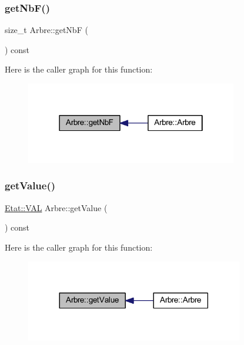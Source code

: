 \mbox{\label{class_arbre_a0aef1f091d76bca13229a21fcd45a076}} 
\subsubsection{\texorpdfstring{get\+Nb\+F()}{getNbF()}}
{\footnotesize\ttfamily size\+\_\+t Arbre\+::get\+NbF (\begin{DoxyParamCaption}{ }\end{DoxyParamCaption}) const}

Here is the caller graph for this function\+:\nopagebreak
\begin{figure}[H]
\begin{center}
\leavevmode
\includegraphics[width=262pt]{class_arbre_a0aef1f091d76bca13229a21fcd45a076_icgraph}
\end{center}
\end{figure}
\mbox{\label{class_arbre_aeaa93d0b192e3cce04adb509b6b29c40}} 
\subsubsection{\texorpdfstring{get\+Value()}{getValue()}}
{\footnotesize\ttfamily \hyperlink{class_etat_af3ddb2296ffc379b7f3ad2bf832f294e}{Etat\+::\+V\+AL} Arbre\+::get\+Value (\begin{DoxyParamCaption}{ }\end{DoxyParamCaption}) const}

Here is the caller graph for this function\+:\nopagebreak
\begin{figure}[H]
\begin{center}
\leavevmode
\includegraphics[width=269pt]{class_arbre_aeaa93d0b192e3cce04adb509b6b29c40_icgraph}
\end{center}
\end{figure}
\mbox{\label{class_arbre_a2a919273c1041a7f024f717cdd638632}} 
